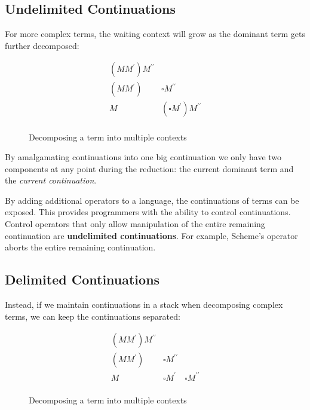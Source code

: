   \subsection{Undelimited Continuations} 
 
  For more complex terms, the waiting context will grow as the dominant term gets further decomposed:
  
  \begin{figure}[H]
    \[
    \begin{array}{ll}
      (MM^\prime) M^{\prime\prime} \\
      (MM^\prime) & \square M^{\prime\prime} \\
      M & (\square M^\prime) M^{\prime\prime} \\
    \end{array}
    \]
  \caption{Decomposing a term into multiple contexts}
  \end{figure}

  By amalgamating continuations into one big continuation we only have two components at any point during the reduction: 
  the current dominant term and the \emph{current continuation}. 
 
  By adding additional operators to a language, the continuations of terms can be exposed.
  This provides programmers with the ability to control continuations.
  Control operators that only allow manipulation of the entire remaining continuation are \textbf{undelimited continuations}. 
  For example, Scheme's  operator aborts the entire remaining continuation.

  \subsection{Delimited Continuations}

  Instead, if we maintain continuations in a stack when decomposing complex terms, 
  we can keep the continuations separated:
  
  \begin{figure}[H]
    \[
    \begin{array}{lll}
      (MM^\prime) M^{\prime\prime} \\
      (MM^\prime) & \square M^{\prime\prime} \\
      M & \square M^\prime & \square M^{\prime\prime} \\
    \end{array}
    \]
  \caption{Decomposing a term into multiple contexts}
  \end{figure}

